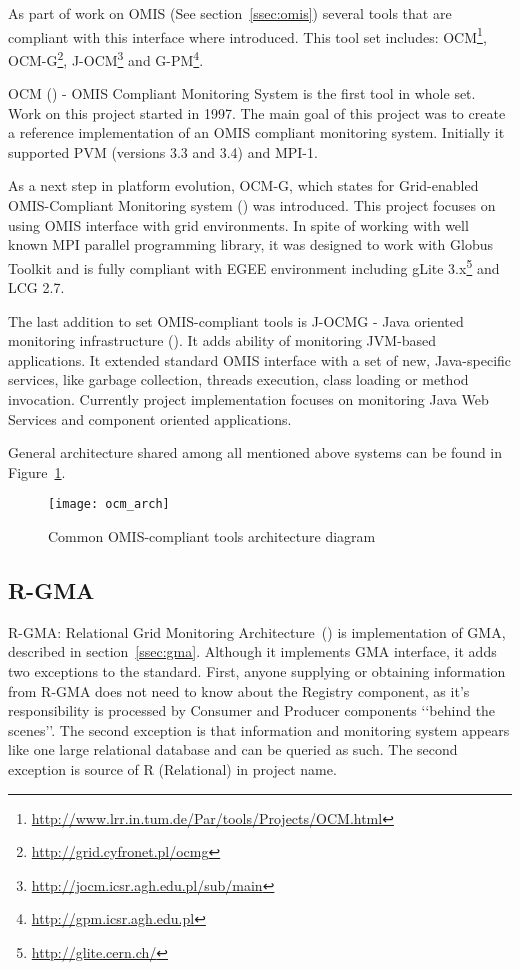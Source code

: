 As part of work on OMIS (See section~\ref{ssec:omis}) several tools that are compliant with this interface where introduced. This tool set includes: OCM\footnote{\url{http://www.lrr.in.tum.de/Par/tools/Projects/OCM.html}}, OCM-G\footnote{\url{http://grid.cyfronet.pl/ocmg}}, J-OCM\footnote{\url{http://jocm.icsr.agh.edu.pl/sub/main}} and G-PM\footnote{\url{http://gpm.icsr.agh.edu.pl}}.

OCM (\cite{RWspdt98, RW:ppam99b}) - OMIS Compliant Monitoring System is the first tool in whole set. Work on this project started in 1997. The main goal of this project was to create a reference implementation of an OMIS compliant monitoring system. Initially it supported PVM (versions 3.3 and 3.4) and MPI-1. 

As a next step in platform evolution, OCM-G, which states for Grid-enabled OMIS-Compliant Monitoring system (\cite{axgrid03b}) was introduced. This project focuses on using OMIS interface with grid environments.  In spite of working with well known MPI parallel programming library, it was designed to work with Globus Toolkit and is fully compliant with EGEE environment including gLite 3.x\footnote{\url{http://glite.cern.ch/}} and LCG 2.7. 

The last addition to set OMIS-compliant tools is J-OCMG - Java oriented monitoring infrastructure (\cite{jocm}). It adds ability of monitoring JVM-based applications. It extended standard OMIS interface with a set of new, Java-specific services, like garbage collection, threads execution, class loading or method invocation. Currently project implementation focuses on monitoring Java Web Services and component oriented applications.

General architecture shared among all mentioned above systems can be found in Figure~\ref{fig:ocmg}.

\begin{figure}[ht]
  \centering
  \texttt{[image: ocm\_arch]}
  \caption{Common OMIS-compliant tools architecture diagram}
  \label{fig:ocmg}
\end{figure}
 
 
 
\subsection{R-GMA}

R-GMA: Relational Grid Monitoring Architecture~(\cite{RGMA1,RGMA2,RGMA3}) is implementation of GMA, described in section~\ref{ssec:gma}. Although it implements GMA interface, it adds two exceptions to the standard. First, anyone supplying or obtaining information from R-GMA does not need to know about the Registry component, as it\rq{}s responsibility is processed by Consumer and Producer components \lq\lq{}behind the scenes\rq\rq{}. The second exception is that information and monitoring system appears like one large relational database and can be queried as such. The second exception is source of R (Relational) in project name.

